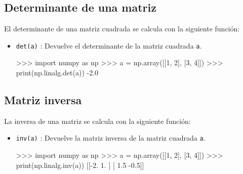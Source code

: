 \documentclass[
  spanish,
  a4paper,
]{scrreport}
\newenvironment{Shaded}{\begin{snugshade}}{\end{snugshade}}
\newcommand{\BuiltInTok}[1]{\textcolor[rgb]{0.00,0.23,0.31}{#1}}
\newcommand{\DecValTok}[1]{\textcolor[rgb]{0.68,0.00,0.00}{#1}}
\newcommand{\FloatTok}[1]{\textcolor[rgb]{0.68,0.00,0.00}{#1}}
\newcommand{\ImportTok}[1]{\textcolor[rgb]{0.00,0.46,0.62}{#1}}
\newcommand{\NormalTok}[1]{\textcolor[rgb]{0.00,0.23,0.31}{#1}}
\newcommand{\OperatorTok}[1]{\textcolor[rgb]{0.37,0.37,0.37}{#1}}
\begin{document}
\subsection{Determinante de una
matriz}\label{determinante-de-una-matriz}

El determinante de una matriz cuadrada se calcula con la siguiente
función:

\begin{itemize}
\item
  \texttt{det(a)} : Devuelve el determinante de la matriz cuadrada
  \texttt{a}.

\begin{Shaded}
\begin{Highlighting}[]
\OperatorTok{\textgreater{}\textgreater{}\textgreater{}} \ImportTok{import}\NormalTok{ numpy }\ImportTok{as}\NormalTok{ np}
\OperatorTok{\textgreater{}\textgreater{}\textgreater{}}\NormalTok{ a }\OperatorTok{=}\NormalTok{ np.array([[}\DecValTok{1}\NormalTok{, }\DecValTok{2}\NormalTok{], [}\DecValTok{3}\NormalTok{, }\DecValTok{4}\NormalTok{]])}
\OperatorTok{\textgreater{}\textgreater{}\textgreater{}} \BuiltInTok{print}\NormalTok{(np.linalg.det(a))}
\OperatorTok{{-}}\FloatTok{2.0}
\end{Highlighting}
\end{Shaded}
\end{itemize}

\subsection{Matriz inversa}\label{matriz-inversa}

La inversa de una matriz se calcula con la siguiente función:

\begin{itemize}
\item
  \texttt{inv(a)} : Devuelve la matriz inversa de la matriz cuadrada
  \texttt{a}.

\begin{Shaded}
\begin{Highlighting}[]
\OperatorTok{\textgreater{}\textgreater{}\textgreater{}} \ImportTok{import}\NormalTok{ numpy }\ImportTok{as}\NormalTok{ np}
\OperatorTok{\textgreater{}\textgreater{}\textgreater{}}\NormalTok{ a }\OperatorTok{=}\NormalTok{ np.array([[}\DecValTok{1}\NormalTok{, }\DecValTok{2}\NormalTok{], [}\DecValTok{3}\NormalTok{, }\DecValTok{4}\NormalTok{]])}
\OperatorTok{\textgreater{}\textgreater{}\textgreater{}} \BuiltInTok{print}\NormalTok{(np.linalg.inv(a))}
\NormalTok{[[}\OperatorTok{{-}}\FloatTok{2.}   \FloatTok{1.}\NormalTok{ ]}
\NormalTok{[ }\FloatTok{1.5} \OperatorTok{{-}}\FloatTok{0.5}\NormalTok{]]}
\end{Highlighting}
\end{Shaded}
\end{itemize}
\end{document}
